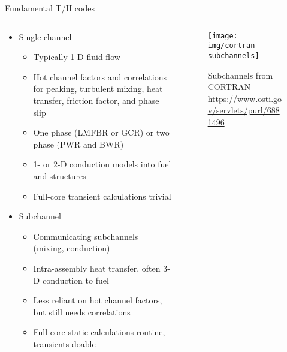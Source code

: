\documentclass[pdf,aspectratio=169]{beamer}
\begin{document}
\begin{frame}{Fundamental T/H codes}
\begin{columns}
    \begin{column}{0.7\textwidth}
        \begin{itemize}
            \item Single channel
                \begin{itemize}
                    \item Typically 1-D fluid flow
                    \item Hot channel factors and correlations for peaking, turbulent mixing,
                        heat transfer, friction factor, and phase slip
                    \item One phase (LMFBR or GCR) or two phase (PWR and BWR)
                    \item 1- or 2-D conduction models into fuel and structures
                    \item Full-core transient calculations trivial
                \end{itemize}
            \item Subchannel 
                \begin{itemize}
                    \item Communicating subchannels (mixing, conduction)
                    \item Intra-assembly heat transfer, often 3-D conduction to fuel
                    \item Less reliant on hot channel factors, but still needs
                        correlations
                    \item Full-core static calculations routine, transients doable
                \end{itemize}
            \end{itemize}
    \end{column}
    \begin{column}{0.3\textwidth}
        \begin{figure}[ht]
        \centering
            \texttt{[image: img/cortran-subchannels]}
            \caption{\tiny Subchannels from CORTRAN \url{https://www.osti.gov/servlets/purl/6881496}}
        \end{figure}
    \end{column}
\end{columns}
\end{frame}
\end{document}
